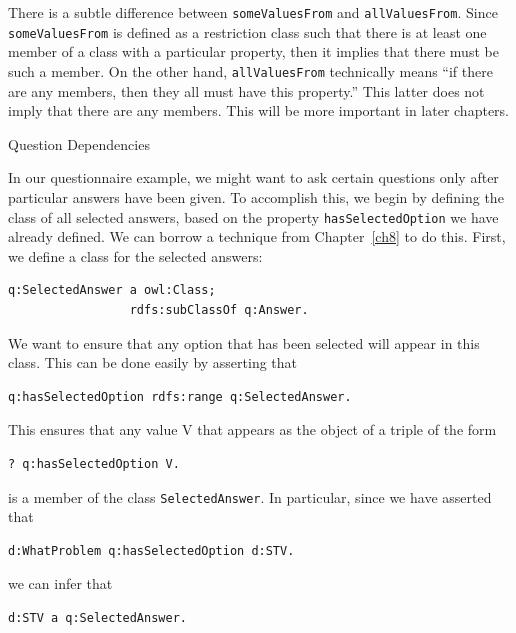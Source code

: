 There is a subtle difference between \texttt{someValuesFrom} and \texttt{allValuesFrom}.
Since
\texttt{someValuesFrom} is defined as a restriction class such that there is at
least one member of a class with a particular property, then it implies
that there must be such a member. On the other hand, \texttt{allValuesFrom}
technically means ``if there are any members, then they all must have
this property.'' This latter does not imply that there are any members.
This will be more important in later chapters.

\begin{example}{Question Dependencies}

In our questionnaire example, we might want to ask certain questions
only after particular answers have been given. To accomplish this, we
begin by defining the class of all selected answers, based on the
property \texttt{hasSelectedOption} we have already defined. We can borrow a
technique from Chapter~\ref{ch8} to do this. First, we define a class for the
selected answers:

\begin{lstlisting}
q:SelectedAnswer a owl:Class;
                 rdfs:subClassOf q:Answer.
\end{lstlisting}

We want to ensure that any option that has been selected will appear in
this class. This can be done easily by asserting that

\begin{lstlisting}
q:hasSelectedOption rdfs:range q:SelectedAnswer.
\end{lstlisting}

This ensures that any value V that appears as the object of a triple of
the form

\begin{lstlisting}
? q:hasSelectedOption V.
\end{lstlisting}

is a member of the class \texttt{SelectedAnswer}. In particular, since we have
asserted that

\begin{lstlisting}
d:WhatProblem q:hasSelectedOption d:STV.
\end{lstlisting}

we can infer that

\begin{lstlisting}
d:STV a q:SelectedAnswer.
\end{lstlisting}

\end{example}

